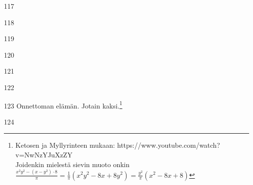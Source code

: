 \begin{Vastaus}{117}
        
\end{Vastaus}
\begin{Vastaus}{118}
        
\end{Vastaus}
\begin{Vastaus}{119}
        
\end{Vastaus}
\begin{Vastaus}{120}
        
\end{Vastaus}
\begin{Vastaus}{121}
        
\end{Vastaus}
\begin{Vastaus}{122}
        
\end{Vastaus}
\begin{Vastaus}{123}
    	Onnettoman elämän. Jotain kaksi.\footnote{Ketosen ja Myllyrinteen mukaan: https://www.youtube.com/watch?v=NwNzYJuXzZY \\ Joidenkin mielestä sievin muoto onkin $\frac{x^2y^2-(x-y^2)\cdot 8}{\pi}=\frac{1}{\pi}(x^2y^2-8x+8y^2)=\frac{y^2}{\pi}(x^2-8x+8)$}
    	
\end{Vastaus}
\begin{Vastaus}{124}
	
\end{Vastaus}
